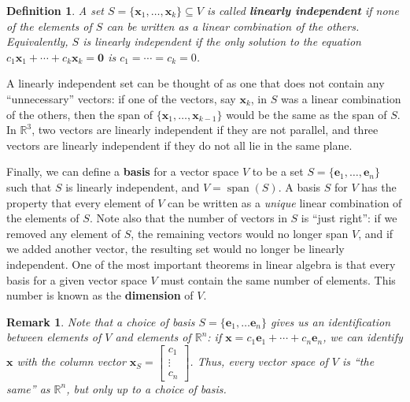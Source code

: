 \documentclass[12pt,letterpaper]{article}
\newtheorem{defn}[theorem]{Definition}
\newenvironment{definition}{\begin{defn}\rm}{\end{defn}}
\newtheorem{rem}[theorem]{Remark}
\newenvironment{remark}{\begin{rem}\rm}{\end{rem}}
\newcommand{\R}{\mathbb{R}}
\newcommand{\x}{\mathbf{x}}
\newcommand{\e}{\mathbf{e}}
\newcommand{\di}{\displaystyle}
\DeclareMathOperator{\spn}{span}
\begin{document}
\begin{definition}
A set $S=\{\x_1,\ldots ,\x_k\}\subseteq V$ is called {\bf linearly independent} if none of the elements of $S$ can be written as a linear combination of the others. Equivalently, $S$ is linearly independent if the only solution to the equation $c_1\x_1+\cdots +c_k\x_k=\mathbf{0}$ is $c_1=\cdots=c_k=0$.
\end{definition}
A linearly independent set can be thought of as one that does not contain any ``unnecessary'' vectors: if one of the vectors, say $\x_k$, in $S$ was a linear combination of the others, then the span of $\{\x_1,\ldots,\x_{k-1}\}$ would be the same as the span of $S$. In $\R^3$, two vectors are linearly independent if they are not parallel, and three vectors are linearly independent if they do not all lie in the same plane.

Finally, we can define a {\bf basis} for a vector space $V$ to be a set $S=\{\e_1,\ldots, \e_n\}$ such that $S$ is linearly independent, and $V=\spn(S)$. A basis $S$ for $V$ has the property that every element of $V$ can be written as a {\em unique} linear combination of the elements of $S$. Note also that the number of vectors in $S$ is ``just right'': if we removed any element of $S$, the remaining vectors would no longer span $V$, and if we added another vector, the resulting set would no longer be linearly independent. One of the most important theorems in linear algebra is that every basis for a given vector space $V$ must contain the same number of elements. This number is known as the {\bf dimension} of $V$.

\begin{remark}\label{ree}
Note that a choice of basis $S=\{\e_1,\ldots \e_n\}$ gives us an identification between elements of $V$ and elements of $\R^n$: if $\x = c_1\e_1+\cdots +c_n\e_n$, we can identify $\x$ with the column vector $\di \x_S = \begin{bmatrix}
c_1\\ \vdots \\ c_n
\end{bmatrix}$. Thus, every vector space of $V$ is ``the same'' as $\R^n$, but only up to a choice of basis.
\end{remark}
\end{document}
